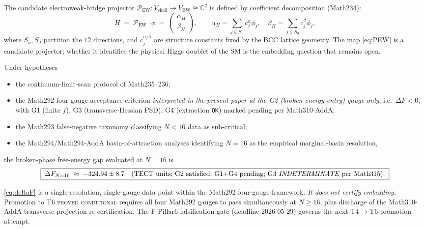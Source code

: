 The candidate electroweak-bridge projector
$\mathcal{P}_{\mathrm{EW}}: V_{\mathrm{shell}}\to V_{\mathrm{EW}}\cong
\mathbb{C}^2$ is defined by coefficient decomposition (Math234):
\begin{equation}\label{eq:PEW}
  H \;=\; \mathcal{P}_{\mathrm{EW}}\cdot\phi \;=\;
  \begin{pmatrix} \alpha_H \\ \beta_H \end{pmatrix},
  \qquad
  \alpha_H = \sum_{j\in S_u} c_j^\alpha \phi_j,
  \quad
  \beta_H = \sum_{j\in S_d} c_j^\beta \phi_j,
\end{equation}
where $S_u,S_d$ partition the $12$ directions, and
$c_j^{\alpha/\beta}$ are structure constants fixed by the BCC lattice
geometry. The map \eqref{eq:PEW} is a candidate projector; whether it
identifies the physical Higgs doublet of the SM is the embedding
question that remains open.

\begin{theorem}[First $\Delta F<0$ data point at $N=16$
(\textbf{T4 STRONG EVIDENCE}, G2-of-4-gauges only)]
\label{thm:main}
Under hypotheses
\begin{itemize}
  \item[(\textbf{H1})] the continuum-limit-scan protocol of
    Math235--236;
  \item[(\textbf{H2})] the Math292 four-gauge acceptance criterion
    \emph{interpreted in the present paper at the G2 (broken-energy
    entry) gauge only}, i.e.\ $\Delta F<0$, with G1 (finite $f$),
    G3 (transverse-Hessian PSD), G4 (extraction \texttt{OK}) marked
    pending per Math310-AddA;
  \item[(\textbf{H3})] the Math293 false-negative taxonomy
    classifying $N<16$ data as sub-critical;
  \item[(\textbf{H4})] the Math294/Math294-AddA basin-of-attraction
    analyses identifying $N=16$ as the empirical marginal-basin
    resolution,
\end{itemize}
the broken-phase free-energy gap evaluated at $N=16$ is
\begin{equation}\label{eq:deltaF}
  \boxed{\;
    \Delta F_{N=16} \;\approx\; -324.94 \pm 8.7
    \quad\text{(TECT units; G2 satisfied; G1+G4 pending; G3 \emph{INDETERMINATE} per Math315).}
  \;}
\end{equation}
\end{theorem}

\begin{remark}\label{rmk:honest-scope}
\eqref{eq:deltaF} is a single-resolution, single-gauge data point
within the Math292 four-gauge framework. \emph{It does not certify
embedding.} Promotion to T6 \textsc{proved conditional} requires
all four Math292 gauges to pass simultaneously at $N \geq 16$, plus
discharge of the Math310-AddA transverse-projection re-certification.
The F-Pillar6 falsification gate (deadline 2026-05-29) governs the
next $\mathrm{T4}\to\mathrm{T6}$ promotion attempt.
\end{remark}

